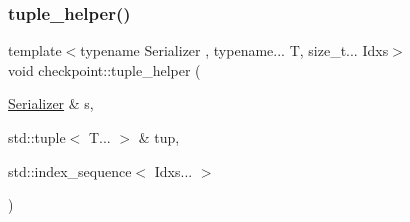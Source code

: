 \mbox{\label{namespacecheckpoint_ab763d3ca9396ff9a1896f5da6c2b3c54}} 
\subsubsection{\texorpdfstring{tuple\+\_\+helper()}{tuple\_helper()}}
{\footnotesize\ttfamily template$<$typename Serializer , typename... T, size\+\_\+t... Idxs$>$ \\
void checkpoint\+::tuple\+\_\+helper (\begin{DoxyParamCaption}\item[{\hyperlink{structcheckpoint_1_1_serializer}{Serializer} \&}]{s,  }\item[{std\+::tuple$<$ T... $>$ \&}]{tup,  }\item[{std\+::index\+\_\+sequence$<$ Idxs... $>$}]{ }\end{DoxyParamCaption})}

